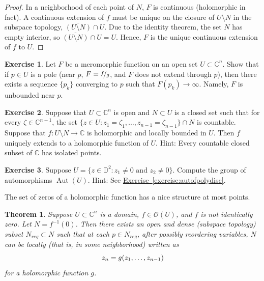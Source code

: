 \documentclass[12pt,openany]{book}
\newcommand{\avoidbreak}{\postdisplaypenalty=100}
\newcommand{\Aut}{\operatorname{Aut}}
\newcommand{\C}{{\mathbb{C}}}
\newcommand{\D}{{\mathbb{D}}}
\newcommand{\sO}{{\mathscr{O}}}
\theoremstyle{plain}
\newtheorem{thm}{Theorem}[section]
\theoremstyle{remark}
\theoremstyle{definition}
\newenvironment{exbox}{%
    \def\FrameCommand{\vrule width 1pt \relax\hspace{10pt}}%
    \MakeFramed{\advance\hsize-\width\FrameRestore}%
}{%
    \endMakeFramed
}
\theoremstyle{exercise}
\newtheorem{exercise}{Exercise}[section]
\theoremstyle{example}
\newcommand{\exerciseref}[1]{\hyperref[#1]{Exercise~\ref*{#1}}}
\begin{document}
\begin{proof}
In a neighborhood of each point of $N$,
$F$ is continuous
(holomorphic in fact).
A continuous extension of $f$ must be unique
on the closure of
$U \setminus N$ in the subspace topology,
$\overline{(U \setminus N)} \cap U$.
Due to the identity theorem, the set $N$ has empty interior,
so $\overline{(U \setminus N)} \cap U = U$.  Hence, $F$ is the unique
continuous extension of $f$ to $U$.
\end{proof}

\begin{exbox}
\begin{exercise}
Let $F$ be a meromorphic function on an open set $U \subset \C^n$.  Show
that if $p \in U$ is a pole (near $p$, $F=\nicefrac{f}{g}$, and $F$ does not
extend through $p$), then there exists a sequence $\{ p_k \}$
converging to $p$ such that $F(p_k) \to \infty$.  Namely, $F$ is
unbounded near $p$.
\end{exercise}

\begin{exercise}
Suppose that $U \subset \C^n$ is open and $N \subset U$ is a closed set
such that for every $\zeta \in \C^{n-1}$, the set
$\{ z \in U : z_{1} = \zeta_1, \ldots, z_{n-1} = \zeta_{n-1} \} \cap N$ is countable.
Suppose that $f \colon U \setminus N \to \C$ is holomorphic and
locally bounded in $U$.  Then $f$ uniquely extends to a holomorphic function
of $U$.  Hint: Every countable closed subset of $\C$ has isolated points.
\end{exercise}

\begin{exercise}
Suppose $U = \{ z \in \D^2 : z_1 \neq 0 \text{ and } z_2 \neq 0 \}$.
Compute the group of automorphisms $\Aut(U)$.
Hint: See \exerciseref{exercise:autofpolydisc}.
\end{exercise}
\end{exbox}

The set of zeros of a holomorphic function has a nice structure at most
points.

\begin{thm} \label{thm:regptsdense}
Suppose $U \subset \C^n$ is a domain,
$f \in \sO(U)$, and $f$ is not identically zero.
Let $N = f^{-1}(0)$.
Then there exists an open and dense
(subspace topology) subset
$N_{\mathit{reg}} \subset N$
such that at each $p \in N_{\mathit{reg}}$, after possibly reordering variables,
$N$ can be locally (that is, in some neighborhood) written as
\begin{equation*}
z_n = g(z_1,\ldots,z_{n-1})
\avoidbreak
\end{equation*}
for a holomorphic function $g$.
\end{thm}
\end{document}
